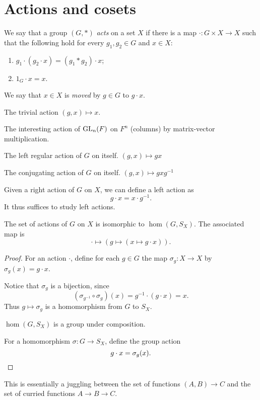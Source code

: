 
\section{Actions and cosets} \label{sec:action}

\begin{definition*}[action] \label{def:action}
    We say that a group $(G, *)$ \emph{acts} on a set $X$ if there is a map
    $\cdot\colon G \times X \to X$ such that the following hold for every
    $g_1, g_2 \in G$ and $x \in X$:
    \begin{enumerate}
        \item $g_1 \cdot (g_2 \cdot x) = (g_1 * g_2) \cdot x$;
        \item $1_G \cdot x = x$.
    \end{enumerate}
    We say that $x \in X$ is \emph{moved} by $g \in G$ to $g \cdot x$.
\end{definition*}
\begin{examples}
    \item The trivial action $(g, x) \mapsto x$.
    \item The interesting action of $\operatorname{GL}_n(F)$ on $F^n$ (columns)
        by matrix-vector multiplication.
    \item The left regular action of $G$ on itself.
        $(g, x) \mapsto gx$
    \item The conjugating action of $G$ on itself.
        $(g, x) \mapsto gxg^{-1}$
\end{examples}
\begin{remark}
    Given a right action of $G$ on $X$, we can define a left action as \[
        g \cdot x = x \cdot g^{-1}.
    \] It thus suffices to study left actions.
\end{remark}

\begin{proposition}
    The set of actions of $G$ on $X$ is isomorphic to $\hom(G, S_X)$.
    The associated map is \[
        \cdot \mapsto (g \mapsto (x \mapsto g \cdot x)).
    \]
\end{proposition}
\begin{proof}
    For an action $\cdot$, define for each $g \in G$ the map
    $\sigma_g\colon X \to X$ by $\sigma_g(x) = g \cdot x$.

    Notice that $\sigma_g$ is a bijection, since \[
        (\sigma_{g^{-1}} \circ \sigma_g)(x) = g^{-1} \cdot (g \cdot x) = x.
    \] Thus $g \mapsto \sigma_g$ is a homomorphism from $G$ to $S_X$.

    $\hom(G, S_X)$ is a group under composition.

    For a homomorphism $\sigma\colon G \to S_X$, define the group action \[
        g \cdot x = \sigma_g(x). \qedhere
    \]
\end{proof}
\begin{remark}
    This is essentially a juggling between the set of functions
    $(A, B) \to C$ and the set of curried functions $A \to B \to C$.
\end{remark}

